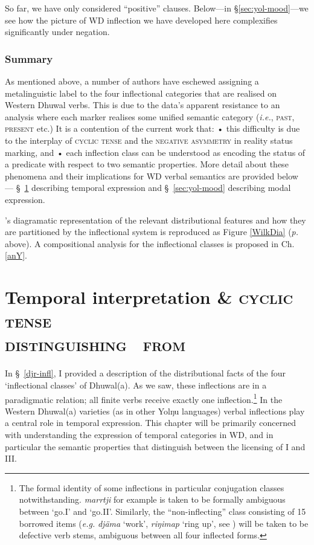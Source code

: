 So far, we have only considered ``positive'' clauses. Below---in \S\ref{sec:yol-mood}---we see how the picture of WD inflection we have developed here complexifies significantly under negation.


\subsection{Summary}

As mentioned above, a number of authors have eschewed assigning a metalinguistic label to the four inflectional categories that are realised on Western Dhuwal verbs. This is due to the data's apparent resistance to an analysis where each marker realises some unified semantic category (\textit{i.e.}, \textsc{past, present} etc.) It is a contention of the current work that: • this difficulty is due to the interplay of \textsc{cyclic tense} and the \textsc{negative asymmetry} in reality status marking, and • each inflection class can be understood as encoding the status of a predicate with respect to two semantic properties. More detail about these phenomena and their implications for WD verbal semantics are provided below --- \S~\ref{sec:djr-temp} describing temporal expression and \S~\ref{sec:yol-mood} describing modal expression. 

\citeauthor{Wilkinson1991}'s diagramatic representation \citeyearpar[326]{Wilkinson1991} of the relevant distributional features and how they are partitioned by the inflectional system is reproduced as Figure \ref{WilkDia} (\textit{p. \pageref{WilkDia}} above). A compositional analysis for the inflectional classes is proposed in Ch. \ref{anY}.


\chapter{Temporal interpretation \& \textsc{cyclic tense\\{\large distinguishing \I~from \III}}}\label{sec:djr-temp}

\noindent In §~\ref{djr-infl}, I provided a description of the distributional facts of the four `inflectional classes' of Dhuwal(a). As we saw, these inflections are in a paradigmatic relation; all finite verbs receive exactly one inflection.\footnote{The formal identity of some inflections in particular conjugation classes notwithstanding. \textit{marrtji} for example is taken to be formally ambiguous between `go.\gls{I}' and `go.\gls{II}'. Similarly, the ``non-inflecting'' class consisting of 15 borrowed items (\textit{e.g.} \textit{djäma} `work', \textit{riŋimap} `ring up', see \citealp[308]{Wilkinson1991}) will be taken to be defective verb stems, ambiguous between all four inflected forms.} In the Western Dhuwal(a) varieties (as in other Yolŋu languages) verbal inflections play a central role in temporal expression. This chapter will be primarily concerned with understanding the expression of temporal categories in WD, and in particular the semantic properties that distinguish between the licensing of \gls{I} and \gls{III}.

